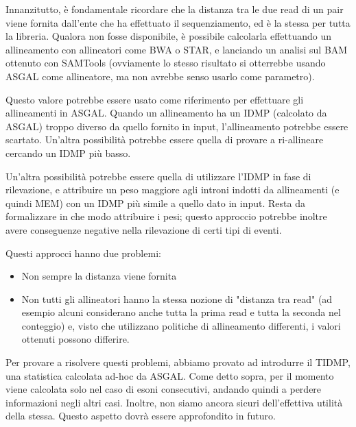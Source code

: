 Innanzitutto, è fondamentale ricordare che la distanza tra le due read di un pair viene fornita dall'ente che ha effettuato il sequenziamento, ed è la stessa per tutta la libreria. Qualora non fosse disponibile, è possibile calcolarla effettuando un allineamento con allineatori come BWA\cite{li2013aligning} o STAR\cite{dobin2013star}, e lanciando un analisi sul BAM ottenuto con SAMTools (ovviamente lo stesso risultato si otterrebbe usando ASGAL come allineatore, ma non avrebbe senso usarlo come parametro).

Questo valore potrebbe essere usato come riferimento per effettuare gli allineamenti in ASGAL. Quando un allineamento ha un IDMP (calcolato da ASGAL) troppo diverso da quello fornito in input, l'allineamento potrebbe essere scartato. Un'altra possibilità potrebbe essere quella di provare a ri-allineare cercando un IDMP più basso. 

Un'altra possibilità potrebbe essere quella di utilizzare l'IDMP in fase di rilevazione, e attribuire un peso maggiore agli introni indotti da allineamenti (e quindi MEM) con un IDMP più simile a quello dato in input. Resta da formalizzare in che modo attribuire i pesi; questo approccio potrebbe inoltre avere conseguenze negative nella rilevazione di certi tipi di eventi.

Questi approcci hanno due problemi:
\begin{itemize}
	\item Non sempre la distanza viene fornita
	\item Non tutti gli allineatori hanno la stessa nozione di "distanza tra read" (ad esempio alcuni considerano anche tutta la prima read e tutta la seconda nel conteggio) e, visto che utilizzano politiche di allineamento differenti, i valori ottenuti possono differire.
\end{itemize}

Per provare a risolvere questi problemi, abbiamo provato ad introdurre il TIDMP, una statistica calcolata ad-hoc da ASGAL. Come detto sopra, per il momento viene calcolata solo nel caso di esoni consecutivi, andando quindi a perdere informazioni negli altri casi. Inoltre, non siamo ancora sicuri dell'effettiva utilità della stessa. Questo aspetto dovrà essere approfondito in futuro.

\newpage